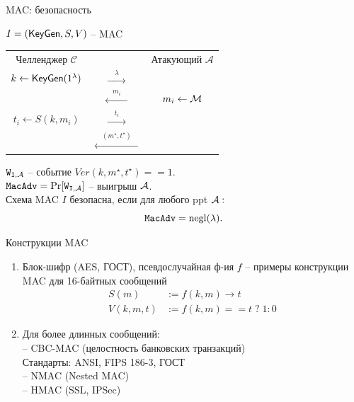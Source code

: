 \documentclass[usenames,dvipsnames,8pt,aspectratio=169]{beamer}
\begin{document}
\begin{frame}{MAC: безопасность}

\Large 
\begin{center}
	$I = (\KeyGen, S, V)$ --  MAC \\[10pt]
	
	\begin{tabular}{c c c}
		{\color{Orange} Челленджер $\mathcal{C}$ } & & {\color{Orange} Атакующий $\mathcal{A}$ }\\ [5pt]
		$k \leftarrow \KeyGen(1^\lambda)$ & $\xrightarrow{\quad \lambda \quad}$  &\\[5pt]
		& $\xleftarrow{\quad  m_i \quad}$  &$m_i\leftarrow \mesS $\\ [5pt]
		
		$t_i \leftarrow S(k, m_i)$ & $\xrightarrow{\quad t_i \quad}$ &\\ [5pt]

		& $\xleftarrow{\quad  (m^\star, t^\star) \quad}$ & \\ [5pt]
	\end{tabular}
	\begin{tikzpicture}[overlay]
	\end{tikzpicture}
\end{center}

\vspace{5pt}
$\mathtt{W_{I, \adv}}$ -- событие $Ver(k, m^\star, t^\star) == 1$. \\ [4pt]
$\mathtt{MacAdv} = \Pr[\mathtt{W_{I, \adv}}] $ -- выигрыш  $\adv$. \\ [4pt]
\color{Orange} Схема MAC $I$ безопасна, если для любого ppt $\adv:$  \[\mathtt{MacAdv} = \negl(\lambda).\]
\end{frame}


\begin{frame}{Конструкции MAC}
\Large
\begin{enumerate}
	\itemsep1em
	\item Блок-шифр  (AES, ГОСТ), псевдослучайная ф-ия $f$  -- примеры конструкции MAC для 16-байтных сообщений
	\begin{align*}
			S(m) &:= f(k, m) \rightarrow t \\
			V(k, m, t) & :=f(k, m) == t \; ? \;  1 : 0 
	\end{align*}

	
	\item Для более длинных сообщений:  \\[10pt]
		-- CBC-MAC (целостность банковских транзакций) \\ 
		Стандарты: ANSI, FIPS 186-3, ГОСТ \\[5pt]
		-- NMAC (Nested MAC) \\[5pt]
		-- HMAC (SSL, IPSec)
\end{enumerate}

\end{frame}
\end{document}
